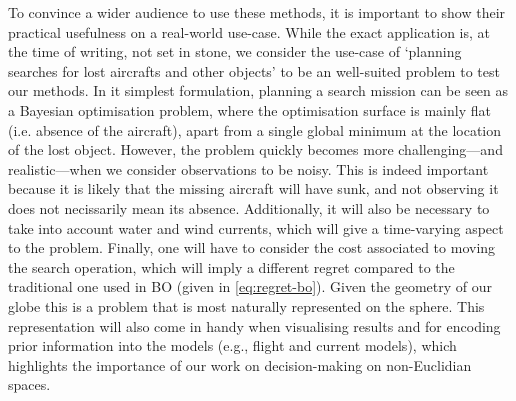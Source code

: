 To convince a wider audience to use these methods, it is important to show their practical usefulness on a real-world use-case. While the exact application is, at the time of writing, not set in stone, we consider the use-case of `planning searches for lost aircrafts and other objects' \citep{stone2014search} to be an well-suited problem to test our methods. In it simplest formulation, planning a search mission can be seen as a Bayesian optimisation problem, where the optimisation surface is mainly flat (i.e. absence of the aircraft), apart from a single global minimum at the location of the lost object. However, the problem quickly becomes more challenging---and realistic---when we consider observations to be noisy. This is indeed important because it is likely that the missing aircraft will have sunk, and not observing it does not necissarily mean its absence. Additionally, it will also be necessary to take into account water and wind currents, which will give a time-varying aspect to the problem. Finally, one will have to consider the cost associated to moving the search operation, which will imply a different regret compared to the traditional one used in BO (given in \cref{eq:regret-bo}). Given the geometry of our globe this is a problem that is most naturally represented on the sphere. This representation will also come in handy when visualising results and for encoding prior information into the models (e.g., flight and current models), which highlights the importance of our work on decision-making on non-Euclidian spaces.







